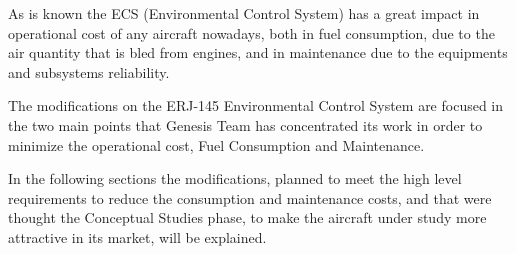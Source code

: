 As is known the ECS (Environmental Control System) has a great impact in operational cost of any aircraft  nowadays, both in fuel consumption, due to the air quantity that is bled from engines, and in maintenance due to the equipments and subsystems reliability.

The modifications on the ERJ-145 Environmental Control System are focused in the two main points that Genesis Team has concentrated its work in order to minimize the operational cost, Fuel Consumption and Maintenance.

In the following sections the modifications, planned to meet the high level
requirements to reduce the consumption and maintenance costs, and that were thought the Conceptual
Studies phase, to make the aircraft under study more attractive in its market, will be explained.
